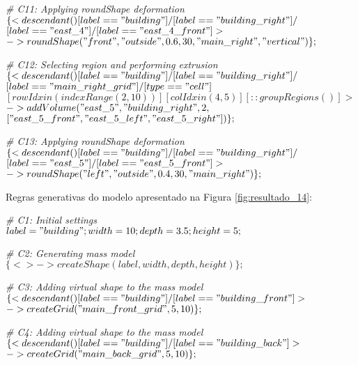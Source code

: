 \noindent \textit{\# C11: Applying roundShape deformation}\\
$\{< descendant() [label=="building"] / [label=="building\_right"] / $\\
$[label=="east\_4"] / [label=="east\_4\_front"] > $\\
$-> roundShape("front", "outside", 0.6, 30, "main\_right", "vertical")\};$

\noindent \textit{\# C12: Selecting region and performing extrusion}\\
$\{< descendant() [label=="building"] / [label=="building\_right"] / $\\
$[label=="main\_right\_grid"] / [type=="cell"] $\\
$[rowIdx in (indexRange(2, 10))] [colIdx in (4, 5)] [::groupRegions()] > $\\
$-> addVolume("east\_5", "building\_right", 2, $\\
$["east\_5\_front", "east\_5\_left", "east\_5\_right"])\};$

\noindent \textit{\# C13: Applying roundShape deformation}\\
$\{< descendant() [label=="building"] / [label=="building\_right"] / $\\
$[label=="east\_5"] / [label=="east\_5\_front"] > $\\
$-> roundShape("left", "outside", 0.4, 30, "main\_right")\};$

\vspace{1cm}

Regras generativas do modelo apresentado na Figura \ref{fig:resultado_14}:

\noindent \textit{\# C1: Initial settings}\\
$label = "building"; width = 10; depth = 3.5; height = 5;$

\noindent \textit{\# C2: Generating mass model}\\
$\{<> -> createShape(label, width, depth, height)\};$

\noindent \textit{\# C3: Adding virtual shape to the mass model}\\
$\{< descendant() [label=="building"] / [label=="building\_front"] > $\\
$-> createGrid("main\_front\_grid", 5, 10)\};$

\noindent \textit{\# C4: Adding virtual shape to the mass model}\\
$\{< descendant() [label=="building"] / [label=="building\_back"] > $\\
$-> createGrid("main\_back\_grid", 5, 10)\};$

